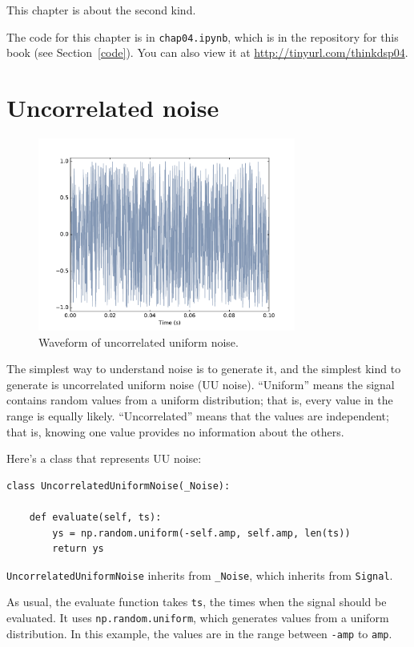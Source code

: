 \documentclass[12pt]{book}
\begin{document}
This chapter is about the second kind.

The code for this chapter is in {\tt chap04.ipynb}, which is in the
repository for this book (see Section~\ref{code}).
You can also view it at \url{http://tinyurl.com/thinkdsp04}.


\section{Uncorrelated noise}

\begin{figure}
\centerline{\includegraphics[height=2.5in]{figs/whitenoise0.pdf}}
\caption{Waveform of uncorrelated uniform noise.}
\label{fig.whitenoise0}
\end{figure}

The simplest way to understand noise is to generate it, and the
simplest kind to generate is uncorrelated uniform noise (UU noise).
``Uniform'' means the signal contains random values from a uniform
distribution; that is, every value in the range is equally likely.
``Uncorrelated'' means that the values are independent; that is,
knowing one value provides no information about the others.

Here's a class that represents UU noise:

\begin{verbatim}
class UncorrelatedUniformNoise(_Noise):

    def evaluate(self, ts):
        ys = np.random.uniform(-self.amp, self.amp, len(ts))
        return ys
\end{verbatim}

{\tt UncorrelatedUniformNoise} inherits from \verb"_Noise", which
inherits from {\tt Signal}.

As usual, the evaluate function takes {\tt ts}, the times when the
signal should be evaluated.  It uses
{\tt np.random.uniform}, which generates values from a
uniform distribution.  In this example, the values are in
the range between {\tt -amp} to {\tt amp}.
\end{document}
